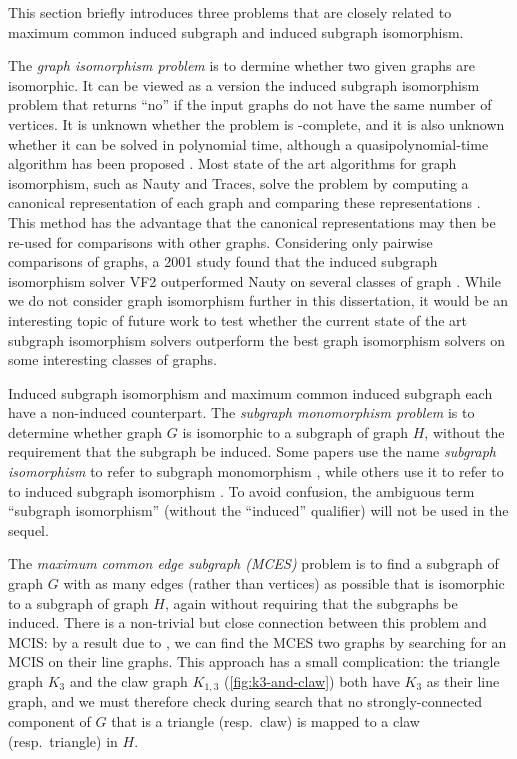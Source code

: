 This section briefly introduces three problems that are closely related to
maximum common induced subgraph and induced subgraph isomorphism.

The \emph{graph isomorphism problem} is to dermine whether two given graphs are
isomorphic. It can be viewed as a version the induced subgraph isomorphism
problem that returns ``no'' if the input graphs do not have the same number of
vertices.  It is unknown whether the problem is \NP-complete, and it is also
unknown whether it can be solved in polynomial time, although a
quasipolynomial-time algorithm has been proposed
\citep{DBLP:conf/stoc/Babai16}.  Most state of the art algorithms for graph
isomorphism, such as Nauty and Traces, solve the problem by computing a
canonical representation of each graph and comparing these representations
\citep{McKay201494}.  This method has the advantage that the canonical
representations may then be re-used for comparisons with other graphs.
Considering only pairwise comparisons of graphs, a 2001 study found that the
induced subgraph isomorphism solver VF2 outperformed Nauty on several classes
of graph \citep{foggia2001performance}.  While we do not consider graph
isomorphism further in this dissertation, it would be an interesting topic of
future work to test whether the current state of the art subgraph isomorphism
solvers outperform the best graph isomorphism solvers on some interesting
classes of graphs.

Induced subgraph isomorphism and maximum common induced subgraph each have a
non-induced counterpart. The \emph{subgraph monomorphism problem} is to
determine whether graph $G$ is isomorphic to a subgraph of graph $H$, without
the requirement that the subgraph be induced.  Some papers use the name
\emph{subgraph isomorphism} to refer to subgraph monomorphism
\citep{DBLP:conf/cp/McCreeshP15}, while others use it to refer to to induced
subgraph isomorphism \citep{DBLP:journals/pami/CarlettiFSV18}.  To avoid
confusion, the ambiguous term ``subgraph isomorphism'' (without the ``induced''
qualifier) will not be used in the sequel.

The \emph{maximum common edge subgraph (MCES)} problem is to find a subgraph of
graph $G$ with as many edges (rather than vertices) as possible that is
isomorphic to a subgraph of graph $H$, again without requiring that the
subgraphs be induced.  There is a non-trivial but close connection between this
problem and MCIS: by a result due to \citet{whitney1932congruent}, we can find
the MCES two graphs by searching for an MCIS on their line graphs.  This
approach has a small complication: the triangle graph $K_3$ and the claw graph
$K_{1,3}$ (\cref{fig:k3-and-claw}) both have $K_3$ as their line graph, and we
must therefore check during search that no strongly-connected component of $G$
that is a triangle (resp.\ claw) is mapped to a claw (resp.\ triangle) in $H$.

